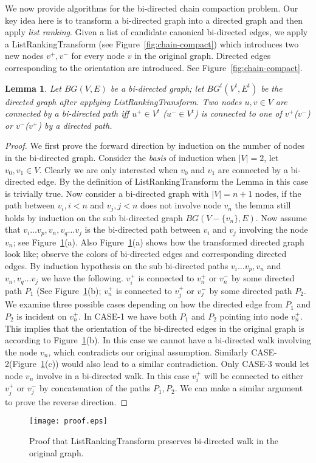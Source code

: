 \documentclass[11pt,conference,twocolumn]{IEEEtran}
\newtheorem{lemma}{Lemma}
\begin{document}
We now provide algorithms for the bi-directed chain compaction problem. Our key idea here is
to transform a bi-directed graph into a directed graph and then apply {\em list ranking}.
Given a list of candidate canonical bi-directed edges, we apply a {\sf ListRankingTransform}
(see Figure~\ref{fig:chain-compact}) which introduces two new nodes $v^+,v^-$ for every node
$v$ in the original graph. Directed edges corresponding to the orientation are introduced. See 
Figure~\ref{fig:chain-compact}. 
\begin{lemma}
\label{lem:bi-lemma}
Let $BG(V,E)$ be a bi-directed graph; let $BG^t(V^t,E^t)$ be the directed graph after applying
{\sf ListRankingTransform}. Two nodes $u,v \in V$ are connected by a bi-directed path iff 
$u^+\in V^t$ ($u^-\in V^t$) is connected to one of $v^+$($v^-$) or $v^-$($v^+$) by a directed path. 
\end{lemma}
\begin{proof}
We first prove the forward direction by induction on the number of nodes in the bi-directed graph. 
Consider the {\em basis} of induction when $|V|=2$, let $v_0,v_1 \in V$. Clearly we are only interested
when $v_0$ and $v_1$ are connected by a bi-directed edge. By the definition of {\sf ListRankingTransform} 
the Lemma in this case is trivially true. Now consider a bi-directed graph with $|V|=n+1$ nodes, if the
path between $v_i, i<n$ and $v_j, j<n$ does not involve node $v_n$ the lemma still holds by induction on 
the sub bi-directed graph $BG(V-\{v_n\},E)$. Now assume that $v_i\ldots v_p,v_n,v_q\ldots v_j$ is the 
bi-directed path between $v_i$ and $v_j$ involving the node $v_n$; see Figure~\ref{fig:proof}(a). 
Also Figure~\ref{fig:proof}(a) shows how the transformed directed graph look like; observe the colors of 
bi-directed edges and corresponding directed edges. By induction hypothesis on the sub bi-directed paths
$v_i\ldots v_p,v_n$ and $v_n,v_q\ldots v_j$ we have the following. $v_i^+$ is connected to $v_n^+$
or $v_n^-$ by some directed path $P_1$ (See Figure~\ref{fig:proof}(b); $v_n^+$ is connected to $v_j^+$ 
or $v_j^-$ by some directed path $P_2$. We examine three possible cases depending on how the directed edge 
from $P_1$ and $P_2$ is incident on $v_n^+$. In {\sf CASE-1} we have both $P_1$ and $P_2$ pointing into
node $v_n^+$. This implies that the orientation of the bi-directed edges in the original graph is
according to Figure~\ref{fig:proof}(b). In this case we cannot have a bi-directed walk involving the node
$v_n$, which contradicts our original assumption. Similarly {\sf CASE-2}(Figure~\ref{fig:proof}(c)) would 
also lead to a similar contradiction. Only {\sf CASE-3} would let node $v_n$ involve in a bi-directed walk.
In this case $v_i^+$ will be connected to either $v_j^+$ or $v_j^-$ by concatenation of the paths $P_1,P_2$.
 We can make a similar argument to prove the reverse direction.
\end{proof}
\begin{figure}
\begin{center}
\texttt{[image: proof.eps]}
\end{center}
\caption{Proof that {\sf ListRankingTransform} preserves bi-directed walk in the original graph.}
\label{fig:proof}
\end{figure}
\end{document}
